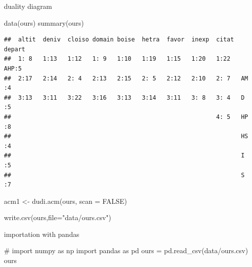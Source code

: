 \documentclass[
  10pt,
]{article}
\newenvironment{Shaded}{\begin{snugshade}}{\end{snugshade}}
\newcommand{\NormalTok}[1]{#1}
\begin{document}
duality diagram

\begin{Shaded}
\begin{Highlighting}[]
\NormalTok{data(ours)}
\NormalTok{summary(ours)}
\end{Highlighting}
\end{Shaded}

\begin{verbatim}
##  altit  deniv  cloiso domain boise  hetra  favor  inexp  citat  depart 
##  1: 8   1:13   1:12   1: 9   1:10   1:19   1:15   1:20   1:22   AHP:5  
##  2:17   2:14   2: 4   2:13   2:15   2: 5   2:12   2:10   2: 7   AM :4  
##  3:13   3:11   3:22   3:16   3:13   3:14   3:11   3: 8   3: 4   D  :5  
##                                                          4: 5   HP :8  
##                                                                 HS :4  
##                                                                 I  :5  
##                                                                 S  :7
\end{verbatim}

\begin{Shaded}
\begin{Highlighting}[]
\NormalTok{acm1 \textless{}{-} dudi.acm(ours, scan = FALSE)}
\end{Highlighting}
\end{Shaded}

\begin{Shaded}
\begin{Highlighting}[]
\NormalTok{write.csv(ours,file="data/ours.csv")}
\end{Highlighting}
\end{Shaded}

importation with pandas

\begin{Shaded}
\begin{Highlighting}[]
\NormalTok{\# import numpy as np }
\NormalTok{import pandas as pd}
\NormalTok{ours = pd.read\_csv(\textquotesingle{}data/ours.csv\textquotesingle{})}
\NormalTok{ours}
\end{Highlighting}
\end{Shaded}
\end{document}
